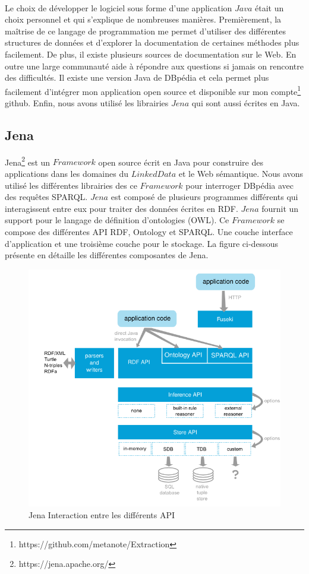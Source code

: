 \paragraph{}
Le choix de développer le logiciel sous forme d'une application $Java$ était un choix personnel et qui s'explique de nombreuses manières. Premièrement, la maîtrise de ce langage de programmation me permet d'utiliser des différentes structures de données et d'explorer la documentation de certaines méthodes plus facilement. De plus, il existe plusieurs sources de documentation sur le Web. En outre une large communauté aide à répondre aux questions si jamais on rencontre des difficultés. Il existe une version Java de DBpédia et cela permet plus facilement d'intégrer mon application open source et disponible sur mon compte\footnote{https://github.com/metanote/Extraction} github. Enfin, nous avons utilisé les librairies $Jena$ qui sont aussi écrites en Java. 
\subsection{Jena}
Jena\footnote{https://jena.apache.org/} est un $Framework$ open source écrit en Java pour construire des applications dans les domaines du
$LinkedData$ et le Web sémantique. Nous avons utilisé les différentes librairies des ce $Framework$ pour interroger DBpédia avec des requêtes SPARQL. $Jena$ est composé de plusieurs programmes différents qui interagissent entre eux pour traiter des données écrites en RDF. $Jena$ fournit un support pour le langage de définition d'ontologies (OWL). Ce $Framework$ se compose des différentes API RDF, Ontology et SPARQL. Une couche interface d'application et une troisième couche pour le stockage. La figure ci-dessous présente en détaille les différentes composantes de Jena.
 \begin{figure}[H]
        \centering
                \includegraphics[width=12cm]{Jena.png}
               \caption{Jena Interaction entre les différents API}
\end{figure}
